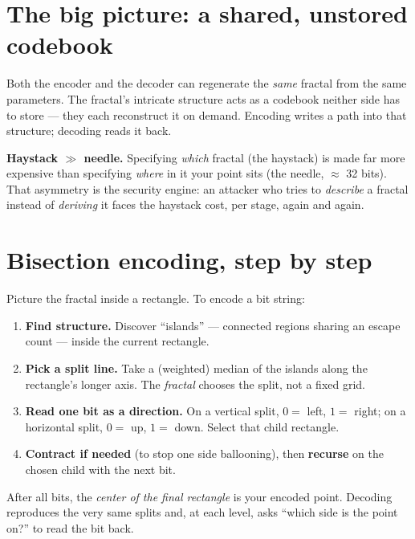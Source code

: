 \documentclass[a4paper,11pt]{report}
\begin{document}

\section{The big picture: a shared, unstored codebook}
Both the encoder and the decoder can regenerate the \emph{same} fractal from the
same parameters. The fractal's intricate structure acts as a codebook neither
side has to store — they each reconstruct it on demand. Encoding writes a path
into that structure; decoding reads it back.

\begin{keyidea}
\textbf{Haystack $\gg$ needle.} Specifying \emph{which} fractal (the haystack)
is made far more expensive than specifying \emph{where} in it your point sits
(the needle, $\approx$ 32 bits). That asymmetry is the security engine: an
attacker who tries to \emph{describe} a fractal instead of \emph{deriving} it
faces the haystack cost, per stage, again and again.
\end{keyidea}

\section{Bisection encoding, step by step}
Picture the fractal inside a rectangle. To encode a bit string:

\begin{enumerate}[leftmargin=1.5em,nosep]
\item \textbf{Find structure.} Discover ``islands'' — connected regions sharing
an escape count — inside the current rectangle.
\item \textbf{Pick a split line.} Take a (weighted) median of the islands along
the rectangle's longer axis. The \emph{fractal} chooses the split, not a fixed
grid.
\item \textbf{Read one bit as a direction.} On a vertical split, $0=$ left,
$1=$ right; on a horizontal split, $0=$ up, $1=$ down. Select that child
rectangle.
\item \textbf{Contract if needed} (to stop one side ballooning), then
\textbf{recurse} on the chosen child with the next bit.
\end{enumerate}

\noindent After all bits, the \emph{center of the final rectangle} is your
encoded point. Decoding reproduces the very same splits and, at each level, asks
``which side is the point on?'' to read the bit back.
\end{document}
